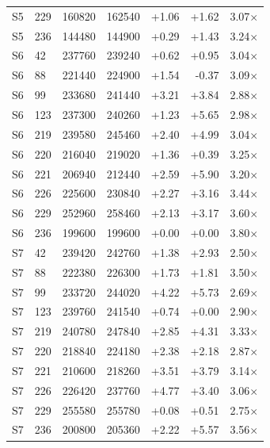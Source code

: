 \begin{longtable}{llrrrrr}
S5 & 229 & 160820 & 162540 & +1.06 & +1.62 & 3.07$\times$ \\
S5 & 236 & 144480 & 144900 & +0.29 & +1.43 & 3.24$\times$ \\
S6 & 42 & 237760 & 239240 & +0.62 & +0.95 & 3.04$\times$ \\
S6 & 88 & 221440 & 224900 & +1.54 & -0.37 & 3.09$\times$ \\
S6 & 99 & 233680 & 241440 & +3.21 & +3.84 & 2.88$\times$ \\
S6 & 123 & 237300 & 240260 & +1.23 & +5.65 & 2.98$\times$ \\
S6 & 219 & 239580 & 245460 & +2.40 & +4.99 & 3.04$\times$ \\
S6 & 220 & 216040 & 219020 & +1.36 & +0.39 & 3.25$\times$ \\
S6 & 221 & 206940 & 212440 & +2.59 & +5.90 & 3.20$\times$ \\
S6 & 226 & 225600 & 230840 & +2.27 & +3.16 & 3.44$\times$ \\
S6 & 229 & 252960 & 258460 & +2.13 & +3.17 & 3.60$\times$ \\
S6 & 236 & 199600 & 199600 & +0.00 & +0.00 & 3.80$\times$ \\
S7 & 42 & 239420 & 242760 & +1.38 & +2.93 & 2.50$\times$ \\
S7 & 88 & 222380 & 226300 & +1.73 & +1.81 & 3.50$\times$ \\
S7 & 99 & 233720 & 244020 & +4.22 & +5.73 & 2.69$\times$ \\
S7 & 123 & 239760 & 241540 & +0.74 & +0.00 & 2.90$\times$ \\
S7 & 219 & 240780 & 247840 & +2.85 & +4.31 & 3.33$\times$ \\
S7 & 220 & 218840 & 224180 & +2.38 & +2.18 & 2.87$\times$ \\
S7 & 221 & 210600 & 218260 & +3.51 & +3.79 & 3.14$\times$ \\
S7 & 226 & 226420 & 237760 & +4.77 & +3.40 & 3.06$\times$ \\
S7 & 229 & 255580 & 255780 & +0.08 & +0.51 & 2.75$\times$ \\
S7 & 236 & 200800 & 205360 & +2.22 & +5.57 & 3.56$\times$ \\
\bottomrule
\end{longtable}
